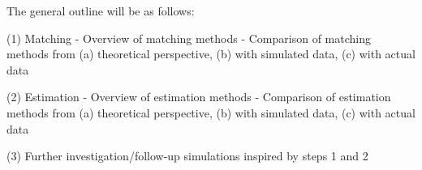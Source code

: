 \documentclass[12pt]{article}
\begin{document}
The general outline will be as follows:

(1) Matching 
- Overview of matching methods
- Comparison of matching methods from (a) theoretical perspective, (b) with simulated data, (c) with actual data

(2) Estimation 
- Overview of estimation methods
- Comparison of estimation methods from (a) theoretical perspective, (b) with simulated data, (c) with actual data

(3) Further investigation/follow-up simulations inspired by steps 1 and 2  








\end{document}
